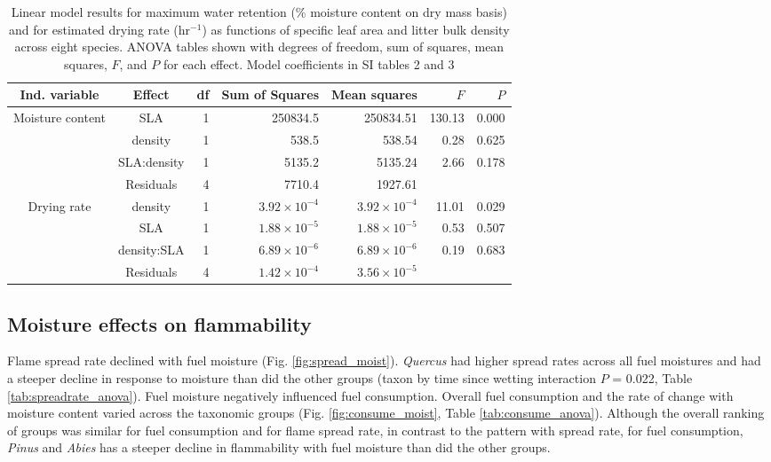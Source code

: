 \documentclass[letterpaper,12pt]{article}
\begin{document}
\begin{table}[h]
  \caption{Linear model results for maximum water retention (\% moisture
    content on dry mass basis) and for estimated drying rate (hr$^{-1}$) as
    functions of specific leaf area and litter bulk density across eight
    species. ANOVA tables shown with degrees of freedom, sum of squares, mean
    squares, $F$, and $P$ for each effect. Model coefficients in SI tables 2 and 3}
  \label{tab:mc_di_anova}
\centering

\begin{tabular}{ccrrrrr}
  \toprule
Ind. variable & Effect & df & Sum of Squares & Mean squares & $F$ & $P$ \\ 
  \midrule
Moisture content & SLA & 1 & 250834.5 & 250834.51 & 130.13 & 0.000 \\ 
  & density & 1 & 538.5 & 538.54 & 0.28 & 0.625 \\ 
  & SLA:density & 1 & 5135.2 & 5135.24 & 2.66 & 0.178 \\ 
  & Residuals & 4 & 7710.4 & 1927.61 &  &  \\ 
  \midrule
  
Drying rate & density & 1 & $3.92 \times 10^{-4}$ & $3.92 \times 10^{-4}$ & 11.01 & 0.029 \\ 
 &  SLA & 1 & $1.88 \times 10^{-5}$ & $1.88 \times 10^{-5}$ & 0.53 & 0.507 \\ 
 &  density:SLA & 1 & $6.89 \times 10^{-6}$ & $6.89 \times 10^{-6}$ & 0.19 & 0.683 \\ 
 &  Residuals & 4 & $1.42 \times 10^{-4}$ & $3.56 \times 10^{-5}$ &  &  \\ 
   \bottomrule

\end{tabular}
\end{table}


\subsection*{Moisture effects on flammability}


Flame spread rate declined with fuel moisture (Fig. \ref{fig:spread_moist}).
\emph{Quercus} had higher spread rates across all fuel moistures and had a
steeper decline in response to moisture than did the other groups (taxon by
time since wetting interaction $P$ = 0.022, Table \ref{tab:spreadrate_anova}).
Fuel moisture negatively influenced fuel consumption. Overall fuel consumption
and the rate of change with moisture content varied across the taxonomic groups
(Fig. \ref{fig:consume_moist}, Table \ref{tab:consume_anova}). Although
the overall ranking of groups was similar for fuel consumption and for flame
spread rate, in contrast to the pattern with spread rate, for fuel consumption,
\emph{Pinus} and \emph{Abies} has a steeper decline in flammability with fuel
moisture than did the other groups.
\end{document}
